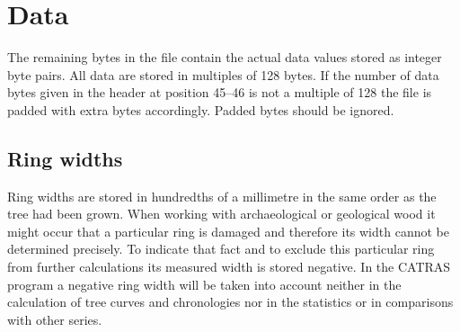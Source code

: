 

\section{Data}

The remaining bytes in the file contain the actual data values stored as integer byte pairs. All data are stored in multiples of 128 bytes. If the number of data bytes given in the header at position 45--46 is not a multiple of 128 the file is padded with extra bytes accordingly. Padded bytes should be ignored. 

\subsection{Ring widths}

Ring widths are stored in hundredths of a millimetre in the same order as the tree had been grown. When working with archaeological or geological wood it might occur that a particular ring is damaged and therefore its width cannot be determined precisely. To indicate that fact and to exclude this particular ring from further calculations its measured width is stored negative. In the CATRAS program a negative ring width will be taken into account neither in the calculation of tree curves and chronologies nor in the statistics or in comparisons with other series.

